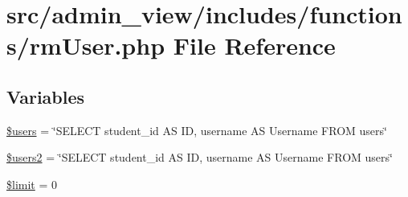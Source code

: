 \hypertarget{rmUser_8php}{\section{src/admin\-\_\-view/includes/functions/rm\-User.php \-File \-Reference}
\label{rmUser_8php}
}
\subsection*{\-Variables}
\begin{DoxyCompactItemize}
\item 
\hyperlink{rmUser_8php_a28005d22fa7ef2dfe215ad886b497d9c}{\$users} = \char`\"{}\-S\-E\-L\-E\-C\-T student\-\_\-id \-A\-S \-I\-D, username \-A\-S \-Username \-F\-R\-O\-M users\char`\"{}
\item 
\hyperlink{rmUser_8php_a62dd122dbddde32a07c3f104eabb051f}{\$users2} = \char`\"{}\-S\-E\-L\-E\-C\-T student\-\_\-id \-A\-S \-I\-D, username \-A\-S \-Username \-F\-R\-O\-M users\char`\"{}
\item 
\hyperlink{rmUser_8php_ae05862a0294251c88629b141b5ce329a}{\$limit} = 0
\end{DoxyCompactItemize}


